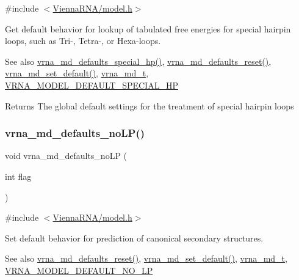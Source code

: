 {\ttfamily \#include $<$\mbox{\hyperlink{model_8h}{Vienna\+R\+N\+A/model.\+h}}$>$}



Get default behavior for lookup of tabulated free energies for special hairpin loops, such as Tri-\/, Tetra-\/, or Hexa-\/loops. 

\begin{DoxySeeAlso}{See also}
\mbox{\hyperlink{group__model__details_gafff6449a02744add0308e653230c15fc}{vrna\+\_\+md\+\_\+defaults\+\_\+special\+\_\+hp()}}, \mbox{\hyperlink{group__model__details_ga70834424cf804d149937de89f80ceb45}{vrna\+\_\+md\+\_\+defaults\+\_\+reset()}}, \mbox{\hyperlink{group__model__details_ga8ac6ff84936282436f822644bf841f66}{vrna\+\_\+md\+\_\+set\+\_\+default()}}, \mbox{\hyperlink{group__model__details_ga1f8a10e12a0a1915f2a4eff0b28ea17c}{vrna\+\_\+md\+\_\+t}}, \mbox{\hyperlink{group__model__details_gabd1ab224e1048defd45c165ed7d1c108}{V\+R\+N\+A\+\_\+\+M\+O\+D\+E\+L\+\_\+\+D\+E\+F\+A\+U\+L\+T\+\_\+\+S\+P\+E\+C\+I\+A\+L\+\_\+\+HP}} 
\end{DoxySeeAlso}
\begin{DoxyReturn}{Returns}
The global default settings for the treatment of special hairpin loops 
\end{DoxyReturn}
\mbox{\label{group__model__details_ga2f88ffc393ac9d7987849c965fd29ea8}} 
\subsubsection{\texorpdfstring{vrna\_md\_defaults\_noLP()}{vrna\_md\_defaults\_noLP()}}
{\footnotesize\ttfamily void vrna\+\_\+md\+\_\+defaults\+\_\+no\+LP (\begin{DoxyParamCaption}\item[{int}]{flag }\end{DoxyParamCaption})}



{\ttfamily \#include $<$\mbox{\hyperlink{model_8h}{Vienna\+R\+N\+A/model.\+h}}$>$}



Set default behavior for prediction of canonical secondary structures. 

\begin{DoxySeeAlso}{See also}
\mbox{\hyperlink{group__model__details_ga70834424cf804d149937de89f80ceb45}{vrna\+\_\+md\+\_\+defaults\+\_\+reset()}}, \mbox{\hyperlink{group__model__details_ga8ac6ff84936282436f822644bf841f66}{vrna\+\_\+md\+\_\+set\+\_\+default()}}, \mbox{\hyperlink{group__model__details_ga1f8a10e12a0a1915f2a4eff0b28ea17c}{vrna\+\_\+md\+\_\+t}}, \mbox{\hyperlink{group__model__details_gab72462726dd60ed0d43339bbf7ee08ad}{V\+R\+N\+A\+\_\+\+M\+O\+D\+E\+L\+\_\+\+D\+E\+F\+A\+U\+L\+T\+\_\+\+N\+O\+\_\+\+LP}} 
\end{DoxySeeAlso}

